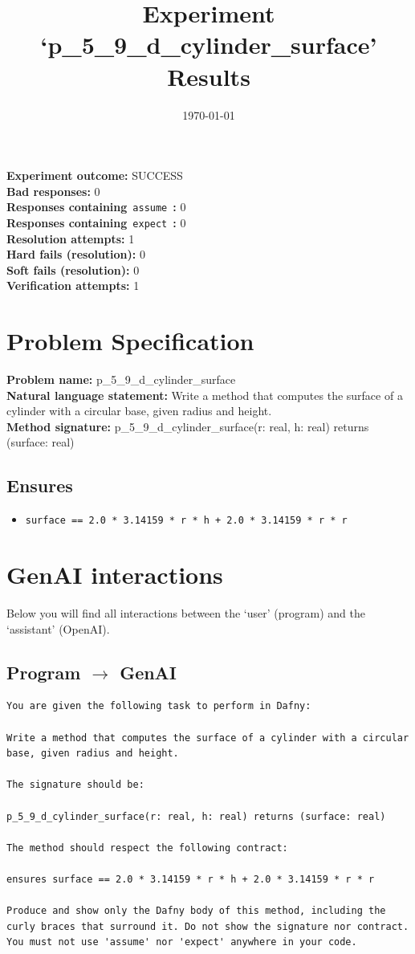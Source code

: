 \documentclass{article}
\begin{document}
\title{Experiment `p\_5\_9\_d\_cylinder\_surface' Results}
\author{\today}
\date{}
\maketitle
\textbf{Experiment outcome: }SUCCESS
\\\textbf{Bad responses: }0
\\\textbf{Responses containing}~\texttt{assume}~\textbf{: }0
\\\textbf{Responses containing}~\texttt{expect}~\textbf{: }0
\\\textbf{Resolution attempts: }1
\\\textbf{Hard fails (resolution): }0
\\\textbf{Soft fails (resolution): }0
\\\textbf{Verification attempts: }1
\section*{Problem Specification}
\textbf{Problem name: }p\_5\_9\_d\_cylinder\_surface
\\\textbf{Natural language statement: }Write a method that computes the surface of a cylinder with a circular base, given radius and height.
\\\textbf{Method signature: }p\_5\_9\_d\_cylinder\_surface(r: real, h: real) returns (surface: real)
\subsection*{Ensures}
\begin{itemize}
\item \texttt{surface == 2.0 * 3.14159 * r * h + 2.0 * 3.14159 * r * r}
\end{itemize}
\clearpage
\section*{GenAI interactions}
Below you will find all interactions between the `user' (program) and the `assistant' (OpenAI).
\subsection*{Program $\rightarrow$ GenAI}
\begin{lstlisting}
You are given the following task to perform in Dafny:

Write a method that computes the surface of a cylinder with a circular base, given radius and height.

The signature should be:

p_5_9_d_cylinder_surface(r: real, h: real) returns (surface: real)

The method should respect the following contract:

ensures surface == 2.0 * 3.14159 * r * h + 2.0 * 3.14159 * r * r

Produce and show only the Dafny body of this method, including the curly braces that surround it. Do not show the signature nor contract. You must not use 'assume' nor 'expect' anywhere in your code.
\end{lstlisting}
\end{document}
